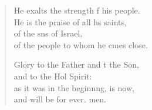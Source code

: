 \begin{verse}
\begin{patverse}
He exalts the strength f his people.\Med\\
    He is the praise of all h\pointup{\i}s saints,\\
of the sns of Israel,\Med\\
    of the people to whom he cmes close.

Glory to the Father and t the Son,\Med\\
    and to the Hol Spirit:\\
as it was in the beginn\pointup{\i}ng, is now,\Med\\
    and will be for ever. men.
  \end{patverse}
\end{verse}
